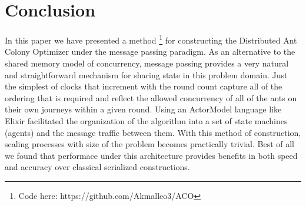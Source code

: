 \documentclass[12pt]{article}
\begin{document}
\section{Conclusion}
In this paper we have presented a method \footnote{Code here: https://github.com/Akmalleo3/ACO} for constructing the Distributed Ant Colony Optimizer 
under the message passing paradigm. As an alternative to the shared memory model of 
concurrency, message passing provides a very natural and straightforward mechanism for 
sharing state in this problem domain. Just the simplest of clocks that 
increment with the round count capture all of the ordering that is required and reflect 
the allowed concurrency of all of the ants on their own journeys within a given round. 
Using an ActorModel language like Elixir facilitated the organization of the algorithm 
into a set of state machines (agents) and the message traffic between them. With this 
method of construction, scaling processes with size of the problem becomes practically trivial.
Best of all we found that performace under this architecture provides benefits in both speed and accuracy
over classical serialized constructions.

\clearpage



\end{document}
